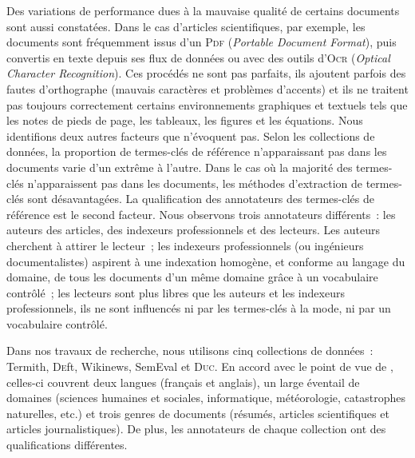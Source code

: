     Des variations de performance dues à la mauvaise qualité de certains
    documents sont aussi constatées. Dans le cas d'articles scientifiques, par
    exemple, les documents sont fréquemment issus d'un \textsc{Pdf}
    (\textit{Portable Document Format}), puis convertis en texte depuis ses flux
    de données ou avec des outils d'\textsc{Ocr} (\textit{Optical Character
    Recognition}). Ces procédés ne sont pas parfaits, ils ajoutent parfois des
    fautes d'orthographe (mauvais caractères et problèmes d'accents) et ils ne
    traitent pas toujours correctement certains environnements graphiques et
    textuels tels que les notes de pieds de page, les tableaux, les figures et
    les équations. Nous identifions deux autres facteurs que
     n'évoquent pas. Selon les collections de
    données, la proportion de termes-clés de référence n'apparaissant pas dans
    les documents varie d'un extrême à l'autre. Dans le cas où la majorité des
    termes-clés n'apparaissent pas dans les documents, les méthodes d'extraction
    de termes-clés sont désavantagées. La qualification des annotateurs des
    termes-clés de référence est le second facteur. Nous observons trois
    annotateurs différents~: les auteurs des articles, des indexeurs
    professionnels et des lecteurs. Les auteurs cherchent à attirer le lecteur~;
    les indexeurs professionnels (ou ingénieurs documentalistes) aspirent à une
    indexation homogène, et conforme au langage du domaine, de tous les
    documents d'un même domaine grâce à un vocabulaire contrôlé~; les lecteurs
    sont plus libres que les auteurs et les indexeurs professionnels, ils ne
    sont influencés ni par les termes-clés \og{}à la mode\fg{}, ni par un
    vocabulaire contrôlé.

    Dans nos travaux de recherche, nous utilisons cinq collections de données~:
    Termith, \textsc{De}ft, Wikinews, SemEval et \textsc{Duc}. En accord avec le
    point de vue de , celles-ci couvrent deux
    langues (français et anglais), un large éventail de domaines (sciences
    humaines et sociales, informatique, météorologie, catastrophes naturelles,
    etc.) et trois genres de documents (résumés, articles scientifiques et
    articles journalistiques). De plus, les annotateurs de chaque collection ont
    des qualifications différentes.


